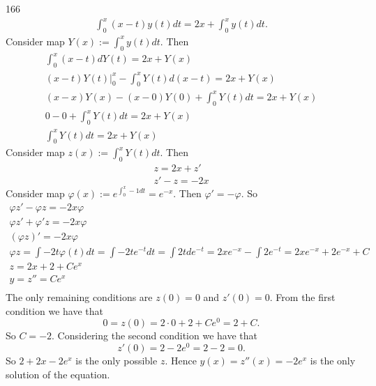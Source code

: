 \documentclass[12pt,a4paper]{article}
\begin{document}
    \begin{problem}{166}
        \begin{gather*}
            \int_0^x (x-t) y(t) dt = 2x + \int_0^x y(t) dt.
        \end{gather*}
        Consider map $Y(x) := \int_0^x y(t) dt$. Then
        \begin{gather*}
            \int_0^x (x-t) dY(t) = 2x + Y(x)\\
            \left.(x-t) Y(t)\right|_0^x - \int_0^x Y(t) d(x-t) = 2x + Y(x)\\
            (x-x)Y(x) - (x-0)Y(0) + \int_0^x Y(t) dt = 2x + Y(x)\\
            0 - 0 + \int_0^x Y(t) dt = 2x + Y(x)\\
            \int_0^x Y(t) dt = 2x + Y(x)
        \end{gather*}
        Consider map $z(x) := \int_0^x Y(t) dt$. Then
        \begin{gather*}
            z = 2x + z'\\
            z' - z = -2x
        \end{gather*}
        Consider map $\varphi(x) := e^{\int_0^x -1dt} = e^{-x}$. Then $\varphi' = -\varphi$. So
        \begin{gather*}
            \varphi z' - \varphi z = -2x \varphi\\
            \varphi z' + \varphi' z = -2x \varphi\\
            (\varphi z)' = -2x \varphi\\
            \varphi z = \int -2t \varphi(t) dt = \int -2t e^{-t} dt = \int 2t d e^{-t} = 2x e^{-x} - \int 2 e^{-t} = 2x e^{-x} + 2 e^{-x} + C\\
            z = 2x + 2 + Ce^x\\
            y = z'' = Ce^x\\
        \end{gather*}
        The only remaining conditions are $z(0) = 0$ and $z'(0) = 0$. From the first condition we have that
        \[0 = z(0) = 2 \cdot 0 + 2 + C e^0 = 2 + C.\]
        So $C = -2$. Considering the second condition we have that
        \[z'(0) = 2 - 2e^0 = 2 - 2 = 0.\]
        So $2 + 2x - 2e^x$ is the only possible $z$. Hence $y(x) = z''(x) = -2e^x$ is the only solution of the equation.
    \end{problem}
\end{document}
